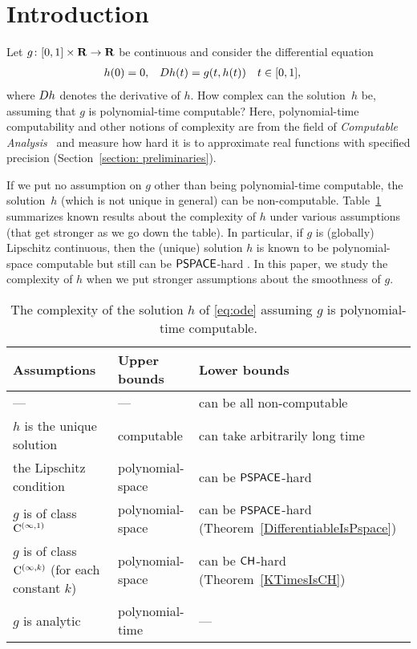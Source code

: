 \section{Introduction}

Let $g \colon [0,1] \times \mathbf R \to \mathbf R$ be continuous 
and consider the differential equation 
\begin{align}
 \label{eq:ode}
 h(0) & = 0, &
 D h(t) & = g(t,h(t)) \quad t \in [0,1], 
\end{align}
where $D h$ denotes the derivative of $h$. 
How complex can the solution~$h$ be, 
assuming that $g$ is polynomial-time computable? 
Here, polynomial-time computability 
and other notions of complexity 
are from the field of 
\emph{Computable Analysis}~\cite{weihrauch00:_comput_analy}
and measure how hard it is to 
approximate real functions with specified precision 
(Section~\ref{section: preliminaries}). 

If we put no assumption on $g$ other than being polynomial-time computable, 
the solution~$h$ (which is not unique in general) can be non-computable. 
Table~\ref{table:related} summarizes known results about 
the complexity of $h$ under various assumptions 
(that get stronger as we go down the table). 
In particular, if $g$ is (globally) Lipschitz continuous, 
then the (unique) solution $h$ is known to be 
polynomial-space computable but still can be 
$\mathsf{PSPACE}$-hard \cite{kawamura2010lipschitz}. 
In this paper, we study the complexity of $h$ 
when we put stronger assumptions about 
the smoothness of $g$. 

\begin{table}
\renewcommand\arraystretch{1.3}
\begin{center}
 \caption{The complexity of the solution $h$ of \eqref{eq:ode}
 assuming $g$ is polynomial-time computable.}
 \label{table:related}
 \begin{tabular}{lll}
  Assumptions & Upper bounds & Lower bounds \\
  \hline
   --- & --- & can be all non-computable \cite{pour1979computable} \\
  $h$ is the unique solution & computable \cite{coddington1955theory}
  & \parbox[t]{14em}{can take arbitrarily long time\\\cite{ko1983computational,miller1970recursive}} \\
  the Lipschitz condition  & polynomial-space \cite{ko1983computational}
      &	can be $\mathsf{PSPACE}$-hard \cite{kawamura2010lipschitz}\\
  $g$ is of class $\mathrm C ^{(\infty, 1)}$ & polynomial-space 
      & \parbox[t]{12em}{can be $\mathsf{PSPACE}$-hard\\(Theorem~\ref{DifferentiableIsPspace})} \\
  \parbox[t]{10.55em}{$g$ is of class $\mathrm C ^{(\infty, k)}$\\{}(for each constant $k$)}
  & polynomial-space 
  & can be $\mathsf{CH}$-hard (Theorem~\ref{KTimesIsCH}) \\
  $g$ is analytic
  & polynomial-time \cite{muller1987uniform,ko1988computing,kawamura2010complexity} 
  & ---
 \end{tabular}
\end{center}
\end{table}

